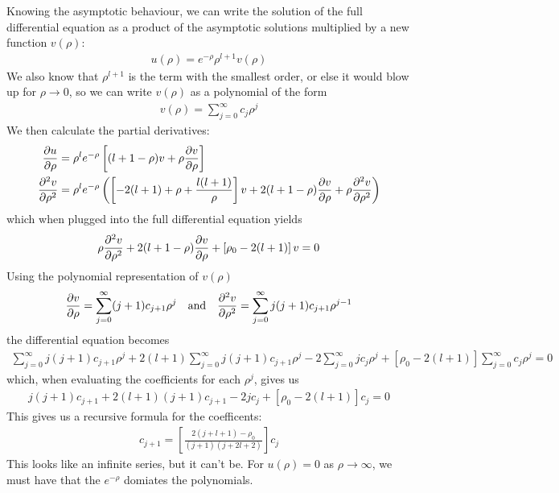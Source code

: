 Knowing the asymptotic behaviour, we can write the solution of the full differential equation as a product of the asymptotic solutions multiplied by a new function $v(\rho)$:
\begin{align*}
	u(\rho) = e^{-\rho} \rho^{l+1} v(\rho)
\end{align*}
We also know that $\rho^{l+1}$ is the term with the smallest order, or else it would blow up for $\rho \to 0$, so we can write $v(\rho)$ as a polynomial of the form
\begin{align*}
	v(\rho) = \sum_{j=0}^{\infty}c_j \rho^{j}
\end{align*}
We then calculate the partial derivatives:
\begin{align*}
	\frac{\partial u}{\partial \rho} &= \rho^{l}e^{-\rho}\left[
		(l+1-\rho)v + \rho \frac{\partial v}{\partial \rho}
	\right]	\\
		\frac{\partial^{2}v}{\partial \rho^{2}}
	&=
	\rho^{l}e^{-\rho} \left(
		\left[
			-2(l+1) + \rho + \frac{l(l+1)}{\rho}
		\right]v
		+
		2(l+1- \rho) \frac{\partial v}{\partial \rho}
		+
		\rho \frac{\partial^{2} v}{\partial \rho^{2}}
	\right)
\end{align*}
which when plugged into the full differential equation yields
\begin{align*}
	\rho \frac{\partial^{2}v}{\partial \rho^{2}} + 2(l+1 - \rho) \frac{\partial v}{\partial \rho} + \left[\rho_0 - 2(l+1)\right]v = 0
\end{align*}
Using the polynomial representation of $v(\rho)$
\begin{align*}
	\frac{\partial v}{\partial \rho} = \sum_{j = 0}^{\infty}(j+1)c_{j+1}\rho^{j} \quad \text{and} \quad \frac{\partial^{2} v}{\partial \rho^{2}} = \sum_{j=0}^{\infty}j(j+1)c_{j+1}\rho^{j-1}
\end{align*}
the differential equation becomes
\begin{align*}
	\sum_{j=0}^{\infty}j(j+1)c_{j+1}\rho^{j} + 2 (l+1) \sum_{j=0}^{\infty} j(j+1)c_{j+1}\rho^{j} - 2 \sum_{j=0}^{\infty}jc_j \rho^{j} + [\rho_0 - 2(l+1)] \sum_{j=0}^{\infty}c_j \rho^{j} = 0
\end{align*}
which, when evaluating the coefficients for each $\rho^{j}$, gives us
\begin{align*}
	j(j+1)c_{j+1} + 2(l+1)(j+1)c_{j+1} - 2jc_j + [\rho_0 - 2(l+1)]c_j = 0
\end{align*}
This gives us a recursive formula for the coefficents:
\begin{align*}
	c_{j+1} = 
	\left[
		\frac{
			2(j+l+1) - \rho_0
		}{
		(j+1)(j+2l + 2)
		} 	
	\right]c_j
\end{align*}
This looks like an infinite series, but it can't be. For $u(\rho) = 0$ as $\rho \to \infty$, we must have that the $e^{-\rho}$ domiates the polynomials.

